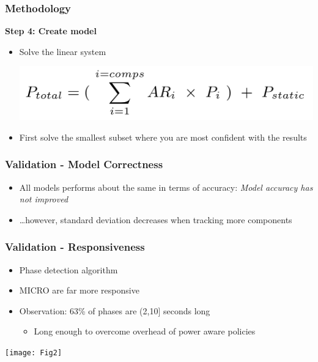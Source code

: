 \documentclass[screen]{beamer}
\begin{document}
\begin{frame}
    \frametitle{Methodology}
    \textbf{Step 4: Create model}

    \begin{itemize}
        \item Solve the linear system

            \includegraphics{Eq1}

        \item First solve the smallest subset where you are most confident with the results
    \end{itemize}

\end{frame}

\begin{frame}
    \frametitle{Validation - Model Correctness}

    \begin{itemize}
        \item All models performs about the same in terms of accuracy: \emph{Model accuracy has not improved}
        \item \ldots however, standard deviation decreases when tracking more components
    \end{itemize}
\end{frame}

\begin{frame}
    \frametitle{Validation - Responsiveness}

    \begin{itemize}
        \item Phase detection algorithm
        \item {\ttfamily MICRO} are far more responsive

    \item Observation: 63\% of phases are (2,10] seconds long
        \begin{itemize}
            \item Long enough to overcome overhead of power aware policies
        \end{itemize}

    \end{itemize}

    \texttt{[image: Fig2]}


\end{frame}
\end{document}
